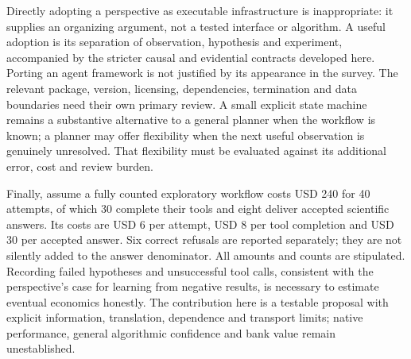 Directly adopting a perspective as executable infrastructure is inappropriate:
it supplies an organizing argument, not a tested interface or algorithm. A useful
adoption is its separation of observation, hypothesis and experiment, accompanied
by the stricter causal and evidential contracts developed here. Porting an agent
framework is not justified by its appearance in the survey. The relevant package,
version, licensing, dependencies, termination and data boundaries need their own
primary review. A small explicit state machine remains a substantive alternative
to a general planner when the workflow is known; a planner may offer flexibility
when the next useful observation is genuinely unresolved. That flexibility must
be evaluated against its additional error, cost and review burden.

Finally, assume a fully counted exploratory workflow costs USD 240 for 40 attempts,
of which 30 complete their tools and eight deliver accepted scientific answers.
Its costs are USD 6 per attempt, USD 8 per tool completion and USD 30 per accepted
answer. Six correct refusals are reported separately; they are not silently added
to the answer denominator. All amounts and counts are stipulated. Recording
failed hypotheses and unsuccessful tool calls, consistent with the perspective's
case for learning from negative results, is necessary to estimate eventual
economics honestly. The contribution here is a testable proposal with explicit
information, translation, dependence and transport limits; native performance,
general algorithmic confidence and bank value remain unestablished.
\citep{exec24_scimethod_original,exec24_scimethod_reference}

